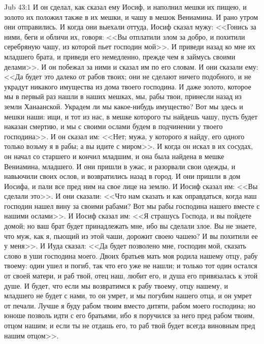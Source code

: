 \vs Jub 43:1
И он сделал, как сказал ему Иосиф, и наполнил
мешки их пищею, и золото их положил также в их
мешки, и чашу в мешок Вениамина. И рано утром они
отправились. И когда они выехали оттуда, Иосиф
сказал мужу: <<Гонись за ними, беги и обличи их,
говоря: <<Вы отплатили злом за добро, и похитили
серебряную чашу, из которой пьет господин мой>>.
И приведи назад ко мне их младшего брата, и
приведи его немедленно, прежде чем я займусь
своими делами>>. И он побежал за ними и сказал им
по его словам. И они сказали ему: <<Да будет это
далеко от рабов твоих; они не сделают ничего
подобного, и не украдут никакого имущества из
дома твоего господина. И даже золото, которое мы в
первый раз нашли в наших мешках, мы, рабы твои,
принесли назад из земли Ханаанской. Украдем ли мы
какое-нибудь имущество? Вот мы здесь и мешки наши:
ищи, и тот из нас, в мешке которого ты найдешь
чашу, пусть будет наказан смертию, и мы с своими
ослами будем в подчинении у твоего господина>>.
И он сказал им: <<Нет; мужа, у которого я найду,
его одного только возьму я в рабы; а вы идите с
миром>>. И когда он искал в их сосудах, он начал
со старшего и кончил младшим, и она была найдена в
мешке Вениамина, младшего. И они пришли в ужас, и
разорвали свои одежды, и навьючили своих ослов, и
возвратились назад в город. И они пришли в дом
Иосифа, и пали все пред ним на свое лице на землю.
И Иосиф сказал им: <<Вы сделали это>>. И они
сказали: <<Что нам сказать и как оправдаться,
когда наш господин нашел вину за своими рабами?
Вот мы рабы господина нашего вместе с нашими
ослами>>. И Иосиф сказал им: <<Я страшусь
Господа, и вы пойдете домой; но ваш брат будет
принадлежать мне, ибо вы сделали злое. Вы не
знаете, что муж, как я, пьющий из этой чаши,
дорожит своею чашею? И вы похитили ее у меня>>. И
Иуда сказал: <<Да будет позволено мне, господин
мой, сказать слово в уши господина моего. Двоих
братьев мать моя родила нашему отцу, рабу твоему:
один ушел и погиб, так что его уже не нашли; и
только тот один остался от своей матери, и раб
твой, отец наш, любит его, и душа его привязалась к
этой душе. И будет, что если мы возвратимся к рабу
твоему, отцу нашему, и младшего не будет с нами, то
он умрет, и мы погубим нашего отца, и он умрет от
печали. Лучше я буду рабом твоим вместо дитяти,
рабом моего господина; но юноше позволь идти с
его братьями, ибо я поручился за него пред рабом
твоим, отцом нашим; и если ты не отдашь его, то раб
твой будет всегда виновным пред нашим отцом>>.

